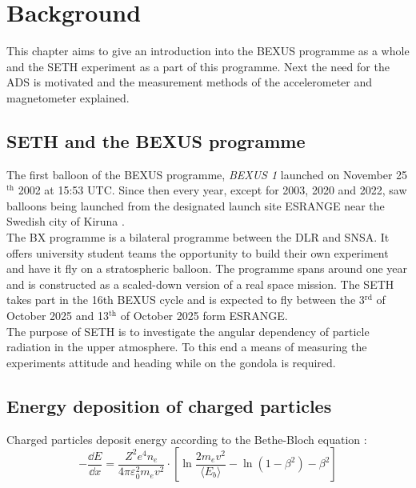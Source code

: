 \chapter{Background \label{ch:background}}
This chapter aims to give an introduction into the \acf{BEXUS} programme as a whole and the \acf{SETH} experiment as a part of this programme. Next the need for the \acf{ADS} is motivated and the measurement methods of the accelerometer and magnetometer explained.

\section{\acs{SETH} and the \acs{BEXUS} programme \label{sec:bg:seth_and_bx_programme}}

The first balloon of the \ac{BEXUS} programme, \textit{BEXUS 1} launched on November 25$^{\mathrm{th}}$ 2002 at 15:53 UTC. Since then every year, except for 2003, 2020 and 2022, saw balloons being launched from the designated launch site \ac{ESRANGE} near the Swedish city of Kiruna \cite{IAC-08.E.1.1.4}\cite{bexus-campaign-history}.\\
The \acf{BX} programme is a bilateral programme between the \acf{DLR} and \acf{SNSA}. It offers university student teams the opportunity to build their own experiment and have it fly on a stratospheric balloon. The programme spans around one year and is constructed as a scaled-down version of a real space mission. The \acf{SETH} takes part in the 16th \ac{BEXUS} cycle and is expected to fly between the 3$^\mathrm{rd}$ of October 2025 and 13$^\mathrm{th}$ of October 2025 form \ac{ESRANGE}.\\

The purpose of \ac{SETH} is to investigate the angular dependency of particle radiation in the upper atmosphere. To this end a means of measuring the experiments attitude and heading while on the gondola is required. 

\section{Energy deposition of charged particles \label{sec:bg:energy-deposition}}
Charged particles deposit energy according to the Bethe-Bloch equation \cite{Demtröder4}:
\begin{equation}
    -\frac{\dd E}{\dd x}=\frac{Z^2e^4n_e}{4\pi\varepsilon_0^2m_ev^2}\cdot\left[\ln{\frac{2m_ev^2}{\langle E_b\rangle}}-\ln{(1-\beta^2)}-\beta^2 \right]
    \label{eq:bg:bethe-bloch}
\end{equation}


